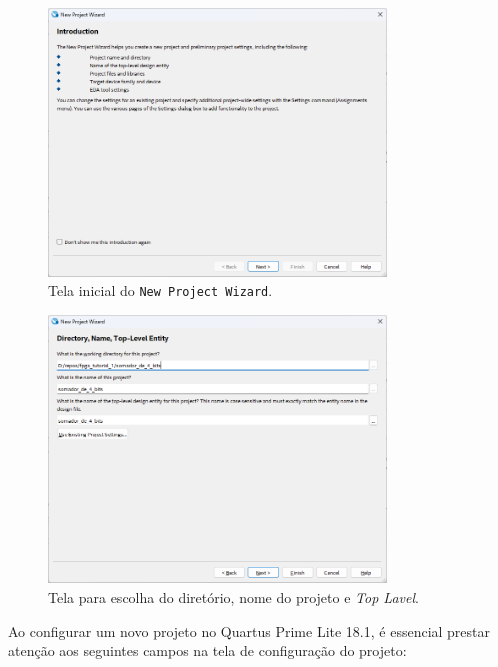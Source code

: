 \documentclass[12pt,a4paper]{article}
\newcommand{\Version}{18.1}
\begin{document}
\begin{figure}[htbp!]
    \centering
    \includegraphics[width=0.8\textwidth]{./figs/NewPj.png}
    \caption{Tela inicial do \texttt{New Project Wizard}.}
    \label{fig:NewPj}
\end{figure}

\begin{figure}[htbp!]
    \centering
    \includegraphics[width=0.8\textwidth]{./figs/Directory.png}
    \caption{Tela para escolha do diretório, nome do projeto e \textit{Top Lavel}.}
    \label{fig:Directory}
\end{figure}

Ao configurar um novo projeto no Quartus Prime Lite \Version, é essencial prestar atenção aos seguintes campos na tela de configuração do projeto:
\end{document}
